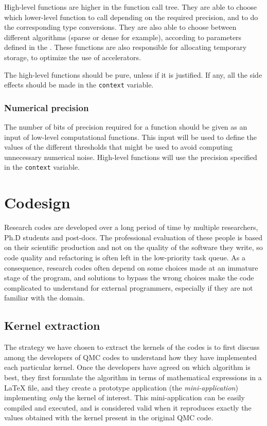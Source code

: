High-level functions  are higher in the function  call tree.
They  are  able  to  choose which  lower-level  function  to  call
depending on the required precision, and to do the corresponding type
conversions. They are also able to choose between different algorithms
(sparse or dense for example), according to parameters defined in the
{\context}.  These functions are also responsible for allocating
temporary storage, to optimize the use of accelerators.

The high-level functions should be pure, unless if it is
justified. If any, all the side effects should be made in the
\texttt{context} variable.

\subsubsection{Numerical precision}

The number of bits of precision  required for a function should be
given as an input of low-level computational functions. This input
will be used to define the values of the different thresholds that
might be used to avoid computing unnecessary numerical
noise. High-level functions will use the precision specified in the
\texttt{context} variable.


\section{Codesign}
\label{sec:codesign}

Research codes are developed over a long period of time by multiple
researchers, Ph.D students and post-docs. The professional evaluation
of these people is based on their scientific production and not on the
quality of the software they write, so code quality and refactoring is
often left in the low-priority task queue. As a consequence, research
codes often depend on some choices made at an immature stage of the
program, and solutions to bypass the wrong choices make the code
complicated to understand for external programmers, especially if they
are not familiar with the domain.

\subsection{Kernel extraction}

The strategy we have chosen to extract the kernels of the codes is to
first discuss among the developers of \ac{QMC} codes to understand how they have
implemented each particular kernel. Once the developers have agreed on
which algorithm is best, they first formulate the algorithm in terms
of mathematical expressions in a {\LaTeX} file, and they create a prototype application 
(the \emph{mini-application}) implementing \emph{only} the kernel of
interest. This mini-application can be easily compiled and executed,
and is considered valid when it reproduces exactly the values obtained
with the kernel present in the original \ac{QMC} code.

